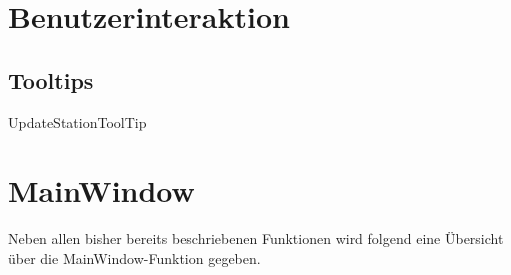 \section{Benutzerinteraktion}

\subsection{Tooltips}
\label{sec:tooltips}
UpdateStationToolTip

\section{MainWindow}

Neben allen bisher bereits beschriebenen Funktionen wird folgend eine Übersicht über die MainWindow-Funktion gegeben. 

